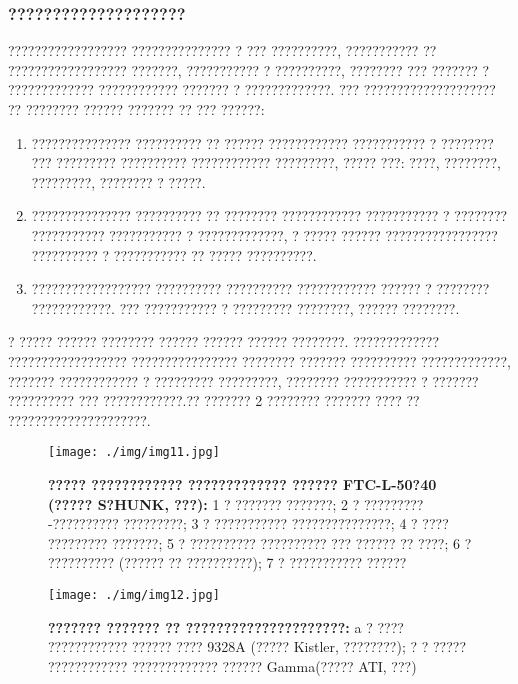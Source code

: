 	\subsubsection {????????????????????}
	
	?????????????????? ??????????????? ? ??? ??????????, ??????????? ?? ?????????????????? ???????, ??????????? ? ??????????, ???????? \cite{pugachev} ??? ??????? ? ????????????? ???????????? ??????? ? ?????????????.
	??? ???????????????????? ?? ???????? ?????? ??????? ?? ??? ??????:
	\begin{enumerate} 
		\item ??????????????? ?????????? ?? ?????? ???????????? ??????????? ? ???????? ??? ????????? ?????????? ???????????? ?????????, ????? ???: ????, ????????, ?????????, ???????? ? ?????.
		
		\item ??????????????? ?????????? ?? ???????? ???????????? ??????????? ? ???????? ??????????? ??????????? ? ?????????????, ? ????? ?????? ????????????????? ?????????? ? ??????????? ?? ????? ??????????.
		
		\item ?????????????????? ?????????? ?????????? ???????????? ?????? ? ???????? ????????????.  ??? ??????????? ? ????????? ????????, ?????? ????????.
		
	\end{enumerate}
	? ????? ?????? ???????? ?????? ?????? ?????? ????????. ????????????? ?????????????????? ???????????????? ???????? ??????? ?????????? ?????????????, ??????? ???????????? ? ????????? ?????????, ???????? ??????????? ? ??????? ?????????? ??? ????????????.?? ??????? 2 ???????? ??????? ???? ?? ?????????????????????.
	\begin{figure}[ht]
		\centering		 
		\texttt{[image: ./img/img11.jpg]}	
		\caption{
			\textbf{ ????? ???????????? ????????????? ?????? FTC-L-50?40 (?????
				S?HUNK, ???):}						
			1 ? ??????? ???????; 2 ? ?????????-??????????
			?????????; 3 ? ??????????? ???????????????; 4 ?
			???? ????????? ???????; 5 ? ?????????? ??????????
			??? ?????? ?? ????; 6 ? ?????????? (?????? ?? ??????????); 7 ? ??????????? ??????
		}     
		\label{fig_img11}
	\end{figure}
	\begin{figure}[ht]
		\centering		 
		\texttt{[image: ./img/img12.jpg]}	
		\caption{
			\textbf{??????? ??????? ?? ?????????????????????: }			
			a ? ???? ???????????? ?????? ???? 9328A (????? Kistler, ????????); ? ? ????? ???????????? ????????????? ?????? Gamma(????? ATI, ???)
		}     
		\label{fig_img12}
	\end{figure}
	
